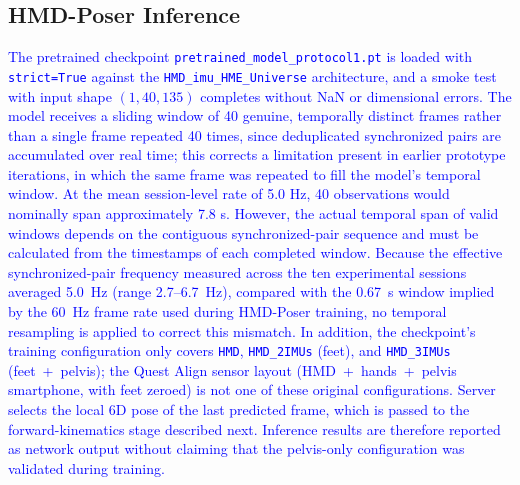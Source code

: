 \documentclass[conference]{IEEEtran}
\newcommand{\CC}[1]{\textcolor{blue}{#1}}
\begin{document}
\subsection{HMD-Poser Inference}
\CC{The pretrained checkpoint \texttt{pretrained\_model\_protocol1.pt} is loaded with
\texttt{strict=True} against the \texttt{HMD\_imu\_HME\_Universe} architecture, and a smoke
test with input shape $(1,40,135)$ completes without NaN or dimensional errors. The model
receives a sliding window of 40 genuine, temporally distinct frames rather than a single
frame repeated 40 times, since deduplicated synchronized pairs are accumulated over real
time; this corrects a limitation present in earlier prototype iterations, in which the same
frame was repeated to fill the model's temporal window. At the mean session-level rate of 5.0 Hz, 40 observations would nominally span approximately 7.8 s. However, the actual temporal span of valid windows depends on the contiguous synchronized-pair sequence and must be calculated from the timestamps of each completed window. Because the effective
synchronized-pair frequency measured across the ten experimental sessions averaged 5.0~Hz
(range 2.7--6.7~Hz), compared with the 0.67~s window implied by the 60~Hz frame rate used during HMD-Poser
training, no temporal resampling is applied to correct this mismatch. In addition, the
checkpoint's training configuration only covers \texttt{HMD}, \texttt{HMD\_2IMUs} (feet),
and \texttt{HMD\_3IMUs} (feet~+~pelvis); the Quest Align sensor layout (HMD~+~hands~+~pelvis
smartphone, with feet zeroed) is not one of these original configurations. Server selects
the local 6D pose of the last predicted frame, which is passed to the forward-kinematics
stage described next. Inference results are therefore reported as network output without
claiming that the pelvis-only configuration was validated during training.}
\end{document}

